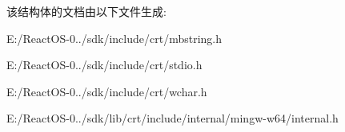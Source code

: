 该结构体的文档由以下文件生成\+:\begin{DoxyCompactItemize}
\item 
E\+:/\+React\+O\+S-\/0../sdk/include/crt/mbstring.\+h\item 
E\+:/\+React\+O\+S-\/0../sdk/include/crt/stdio.\+h\item 
E\+:/\+React\+O\+S-\/0../sdk/include/crt/wchar.\+h\item 
E\+:/\+React\+O\+S-\/0../sdk/lib/crt/include/internal/mingw-\/w64/internal.\+h\end{DoxyCompactItemize}
